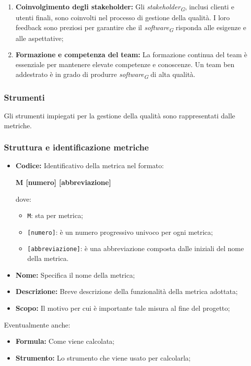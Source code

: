 \begin{enumerate}
    \item \textbf{Coinvolgimento degli stakeholder:}
        Gli \textit{stakeholder}\textsubscript{\textit{G}}, inclusi clienti e utenti finali, sono coinvolti nel processo di gestione della qualità. I loro feedback sono preziosi per garantire che il \textit{software}\textsubscript{\textit{G}} risponda alle esigenze e alle aspettative;

    \item \textbf{Formazione e competenza del team:}
        La formazione continua del team è essenziale per mantenere elevate competenze e conoscenze. Un team ben addestrato è in grado di produrre \textit{software}\textsubscript{\textit{G}} di alta qualità.
\end{enumerate}

\subsubsection{Strumenti}
Gli strumenti impiegati per la gestione della qualità sono rappresentati dalle metriche.

\subsubsection{Struttura e identificazione metriche}
\begin{itemize}
    \item \textbf{Codice:} Identificativo della metrica nel formato:
        \begin{center}
            \textbf{M [numero] [abbreviazione]}
        \end{center}
        dove:
        \begin{itemize}
            \item \texttt{M}: sta per metrica;
            \item \texttt{[numero]}: è un numero progressivo univoco per ogni metrica;
            \item \texttt{[abbreviazione]}: è una abbreviazione composta dalle iniziali del nome della metrica.
        \end{itemize}
    \item \textbf{Nome:} Specifica il nome della metrica;
    \item \textbf{Descrizione:} Breve descrizione della funzionalità della metrica adottata;
    \item \textbf{Scopo:}
        Il motivo per cui è importante tale misura al fine del progetto;

\end{itemize}
    \vspace{0.2cm}
    Eventualmente anche:
\begin{itemize}
    \item \textbf{Formula:} Come viene calcolata;
    \item \textbf{Strumento:} Lo strumento che viene usato per calcolarla;
\end{itemize}

